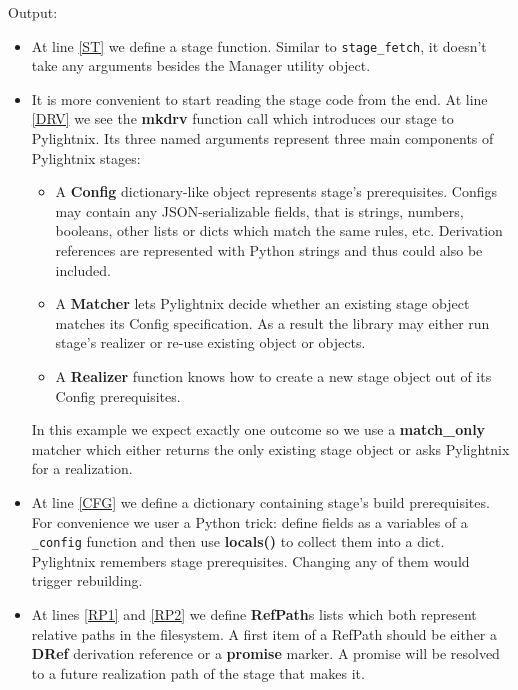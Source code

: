 \documentclass{article}
\newcommand{\mysmallstdout}{\begin{mdframed}\footnotesize{\texttt{\stdoutpythontex[verbatim][breaklines,breakafter=0123456789-/]}}\end{mdframed}}
\begin{document}
Output:

\mysmallstdout


\begin{itemize}
  \item At line \ref{ST} we define a stage function. Similar to
    \texttt{stage\_fetch}, it doesn't take any arguments besides the
    Manager utility object.
  \item It is more convenient to start reading the stage code from the end.
    At line \ref{DRV} we see the \textbf{mkdrv} function call which
    introduces our stage to Pylightnix. Its three named arguments represent
    three main components of Pylightnix stages:
    \begin{itemize}
      \item A \textbf{Config} dictionary-like object represents stage's
        prerequisites. Configs may contain any JSON-serializable fields,
        that is strings, numbers, booleans, other lists or dicts which
        match the same rules, etc. Derivation references are represented
        with Python strings and thus could also be included.
      \item A \textbf{Matcher} lets Pylightnix decide whether an
        existing stage object matches its Config specification. As a result
        the library may either run stage's realizer or re-use existing
        object or objects.
      \item A \textbf{Realizer} function knows how to create a new
        stage object out of its Config prerequisites.
    \end{itemize}
    In this example we expect exactly one outcome so we use a
    \textbf{match\_only} matcher which either returns the only existing
    stage object or asks Pylightnix for a realization.

  \item At line \ref{CFG} we define a dictionary containing stage's build
    prerequisites. For convenience we user a Python trick: define fields as
    a variables of a \texttt{\_config} function and then use
    \textbf{locals()} to collect them into a dict. Pylightnix remembers
    stage prerequisites. Changing any of them would trigger rebuilding.

  \item At lines \ref{RP1} and \ref{RP2} we define \textbf{RefPath}s lists
    which both represent relative paths in the filesystem. A first item of
    a RefPath should be either a \textbf{DRef} derivation reference or
    a \textbf{promise} marker. A promise will be resolved to a future
    realization path of the stage that makes it.


\end{itemize}
\end{document}
